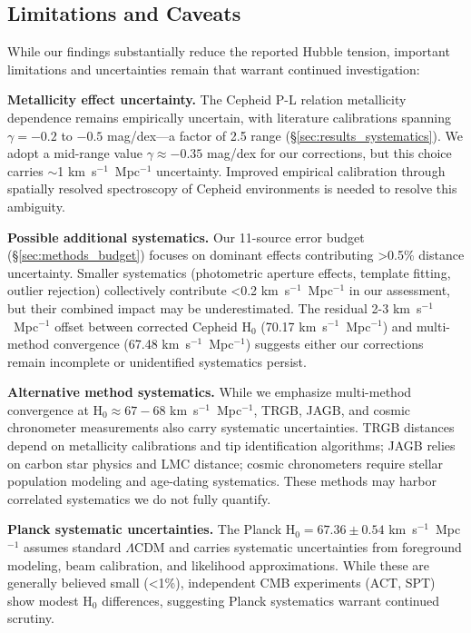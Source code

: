 \documentclass[twocolumn, linenumbers]{aastex701}
\begin{document}
\subsection{Limitations and Caveats}

While our findings substantially reduce the reported Hubble tension, important limitations and uncertainties remain that warrant continued investigation:

\textbf{Metallicity effect uncertainty.} The Cepheid P-L relation metallicity dependence remains empirically uncertain, with literature calibrations spanning $\gamma = -0.2$ to $-0.5$ mag/dex---a factor of 2.5 range (\S\ref{sec:results_systematics}). We adopt a mid-range value $\gamma \approx -0.35$ mag/dex for our corrections, but this choice carries $\sim$1 km~s$^{-1}$~Mpc$^{-1}$ uncertainty. Improved empirical calibration through spatially resolved spectroscopy of Cepheid environments is needed to resolve this ambiguity.

\textbf{Possible additional systematics.} Our 11-source error budget (\S\ref{sec:methods_budget}) focuses on dominant effects contributing >0.5\% distance uncertainty. Smaller systematics (photometric aperture effects, template fitting, outlier rejection) collectively contribute <0.2 km~s$^{-1}$~Mpc$^{-1}$ in our assessment, but their combined impact may be underestimated. The residual 2-3 km~s$^{-1}$~Mpc$^{-1}$ offset between corrected Cepheid H$_0$ (70.17 km~s$^{-1}$~Mpc$^{-1}$) and multi-method convergence (67.48 km~s$^{-1}$~Mpc$^{-1}$) suggests either our corrections remain incomplete or unidentified systematics persist.

\textbf{Alternative method systematics.} While we emphasize multi-method convergence at H$_0 \approx 67-68$ km~s$^{-1}$~Mpc$^{-1}$, TRGB, JAGB, and cosmic chronometer measurements also carry systematic uncertainties. TRGB distances depend on metallicity calibrations and tip identification algorithms; JAGB relies on carbon star physics and LMC distance; cosmic chronometers require stellar population modeling and age-dating systematics. These methods may harbor correlated systematics we do not fully quantify.

\textbf{Planck systematic uncertainties.} The Planck H$_0 = 67.36 \pm 0.54$ km~s$^{-1}$~Mpc$^{-1}$ assumes standard $\Lambda$CDM and carries systematic uncertainties from foreground modeling, beam calibration, and likelihood approximations. While these are generally believed small (<1\%), independent CMB experiments (ACT, SPT) show modest H$_0$ differences, suggesting Planck systematics warrant continued scrutiny.
\end{document}
